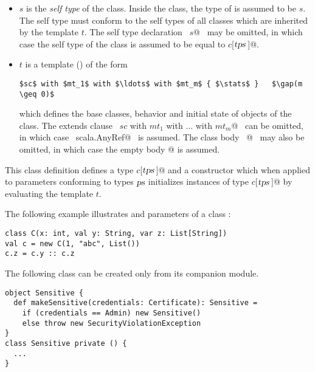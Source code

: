 \begin{itemize}
\item[] 
$s$ is the {\em self type} of the class. Inside the
class, the type of  is assumed to be $s$.  The self
type must conform to the self types of all classes which are inherited
by the template $t$. The self type declaration ~\lstinline@requires $s$@~ may be
omitted, in which case the self type of the class is assumed to be
equal to \lstinline@$c$[$\mbox{\sl tps}\,$]@.
\item[] 
$t$ is a
template () of the form
\begin{lstlisting}
$sc$ with $mt_1$ with $\ldots$ with $mt_m$ { $\stats$ }   $\gap(m \geq 0)$
\end{lstlisting}
which defines the base classes, behavior and initial state of objects of
the class. The extends clause ~\lstinline@extends $sc$ with $mt_1$ with $\ldots$ with $mt_m$@~ 
can be omitted, in which case
~\lstinline@extends scala.AnyRef@~ is assumed.  The class body
~\lstinline@{$\stats\,$}@~ may also be omitted, in which case the empty body
\lstinline@{}@ is assumed.
\end{itemize}
This class definition defines a type \lstinline@$c$[$\mbox{\sl tps}\,$]@ and a constructor
which when applied to parameters conforming to types $\mbox{\sl ps}$
initializes instances of type \lstinline@$c$[$\mbox{\sl tps}\,$]@ by evaluating the template
$t$.

\example The following example illustrates  and 
parameters of a class :
\begin{lstlisting}
class C(x: int, val y: String, var z: List[String])
val c = new C(1, "abc", List())
c.z = c.y :: c.z
\end{lstlisting}

\example\label{ex:private-constr}
The following class can be created only from its companion
module.
\begin{lstlisting}
object Sensitive {
  def makeSensitive(credentials: Certificate): Sensitive = 
    if (credentials == Admin) new Sensitive() 
    else throw new SecurityViolationException
}
class Sensitive private () {
  ...
}
\end{lstlisting}


